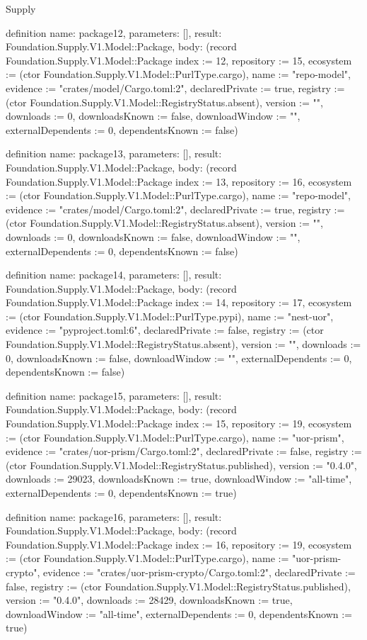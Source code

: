 \begin{lexlean}{Supply}
\begin{semanticmodule}
definition{
  name: package12,
  parameters: [],
  result: Foundation.Supply.V1.Model::Package,
  body: (record Foundation.Supply.V1.Model::Package {index := 12, repository := 15, ecosystem := (ctor Foundation.Supply.V1.Model::PurlType.cargo), name := "repo-model", evidence := "crates/model/Cargo.toml:2", declaredPrivate := true, registry := (ctor Foundation.Supply.V1.Model::RegistryStatus.absent), version := "", downloads := 0, downloadsKnown := false, downloadWindow := "", externalDependents := 0, dependentsKnown := false})
}

definition{
  name: package13,
  parameters: [],
  result: Foundation.Supply.V1.Model::Package,
  body: (record Foundation.Supply.V1.Model::Package {index := 13, repository := 16, ecosystem := (ctor Foundation.Supply.V1.Model::PurlType.cargo), name := "repo-model", evidence := "crates/model/Cargo.toml:2", declaredPrivate := true, registry := (ctor Foundation.Supply.V1.Model::RegistryStatus.absent), version := "", downloads := 0, downloadsKnown := false, downloadWindow := "", externalDependents := 0, dependentsKnown := false})
}

definition{
  name: package14,
  parameters: [],
  result: Foundation.Supply.V1.Model::Package,
  body: (record Foundation.Supply.V1.Model::Package {index := 14, repository := 17, ecosystem := (ctor Foundation.Supply.V1.Model::PurlType.pypi), name := "nest-uor", evidence := "pyproject.toml:6", declaredPrivate := false, registry := (ctor Foundation.Supply.V1.Model::RegistryStatus.absent), version := "", downloads := 0, downloadsKnown := false, downloadWindow := "", externalDependents := 0, dependentsKnown := false})
}

definition{
  name: package15,
  parameters: [],
  result: Foundation.Supply.V1.Model::Package,
  body: (record Foundation.Supply.V1.Model::Package {index := 15, repository := 19, ecosystem := (ctor Foundation.Supply.V1.Model::PurlType.cargo), name := "uor-prism", evidence := "crates/uor-prism/Cargo.toml:2", declaredPrivate := false, registry := (ctor Foundation.Supply.V1.Model::RegistryStatus.published), version := "0.4.0", downloads := 29023, downloadsKnown := true, downloadWindow := "all-time", externalDependents := 0, dependentsKnown := true})
}

definition{
  name: package16,
  parameters: [],
  result: Foundation.Supply.V1.Model::Package,
  body: (record Foundation.Supply.V1.Model::Package {index := 16, repository := 19, ecosystem := (ctor Foundation.Supply.V1.Model::PurlType.cargo), name := "uor-prism-crypto", evidence := "crates/uor-prism-crypto/Cargo.toml:2", declaredPrivate := false, registry := (ctor Foundation.Supply.V1.Model::RegistryStatus.published), version := "0.4.0", downloads := 28429, downloadsKnown := true, downloadWindow := "all-time", externalDependents := 0, dependentsKnown := true})
}


\end{semanticmodule}
\end{lexlean}
